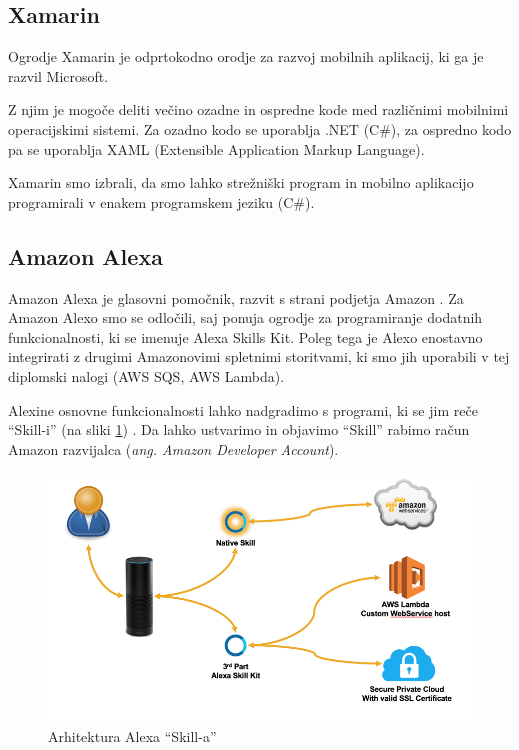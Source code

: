 \documentclass[a4paper, 12pt]{book}
\begin{document}
\subsection{Xamarin}

Ogrodje Xamarin \cite{xamarin} je odprtokodno orodje za razvoj mobilnih aplikacij, ki ga je razvil Microsoft. 

Z njim je mogoče deliti večino ozadne in ospredne kode med različnimi mobilnimi operacijskimi sistemi. 
Za ozadno kodo se uporablja .NET (C\#), za ospredno kodo pa se uporablja XAML (Extensible Application Markup Language).

Xamarin smo izbrali, da smo lahko strežniški program in mobilno aplikacijo programirali v enakem programskem jeziku (C\#).

\subsection{Amazon Alexa}


Amazon Alexa je glasovni pomočnik, razvit s strani podjetja Amazon \cite{alexa}.
Za Amazon Alexo smo se odločili, saj ponuja ogrodje za programiranje dodatnih funkcionalnosti, ki se imenuje Alexa Skills Kit.
Poleg tega je Alexo enostavno integrirati z drugimi Amazonovimi spletnimi storitvami, ki smo jih uporabili v tej diplomski nalogi (AWS SQS, AWS Lambda).


Alexine osnovne funkcionalnosti lahko nadgradimo s programi, ki se jim reče \enquote{Skill-i} (na sliki \ref{alexa_architecture}) \cite{alexaskills, alexaarchitecture}.
Da lahko ustvarimo in objavimo \enquote{Skill} rabimo račun Amazon razvijalca (\textit{ang. Amazon Developer Account}).

\begin{figure}[H]
\begin{center}
\includegraphics[width=13cm]{alexa_architecture}
\end{center}
\caption{Arhitektura Alexa \enquote{Skill-a}}
\label{alexa_architecture}
\end{figure}
\end{document}
